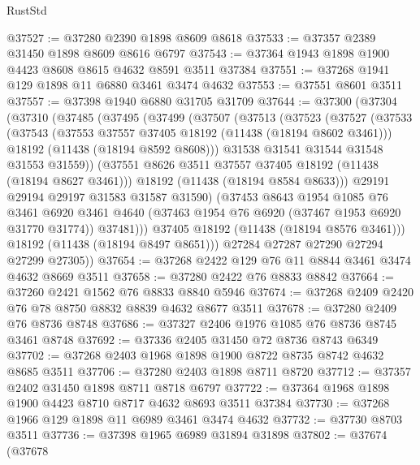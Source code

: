 \begin{lexlean}{RustStd}
\begin{coremodule}
@37527 := @37280 @2390 @1898 @8609 @8618
@37533 := @37357 @2389 @31450 @1898 @8609 @8616 @6797
@37543 := @37364 @1943 @1898 @1900 @4423 @8608 @8615 @4632 @8591 @3511 @37384
@37551 := @37268 @1941 @129 @1898 @11 @6880 @3461 @3474 @4632
@37553 := @37551 @8601 @3511
@37557 := @37398 @1940 @6880 @31705 @31709
@37644 := @37300
    (@37304
      (@37310
        (@37485
          (@37495
            (@37499
              (@37507
                (@37513
                  (@37523
                    (@37527
                      (@37533
                        (@37543
                          (@37553 @37557 @37405 @18192 (@11438 (@18194 @8602 @3461)))
                          @18192
                          (@11438 (@18194 @8592 @8608)))
                        @31538
                        @31541
                        @31544
                        @31548
                        @31553
                        @31559))
                    (@37551 @8626 @3511 @37557 @37405 @18192 (@11438 (@18194 @8627 @3461)))
                    @18192
                    (@11438 (@18194 @8584 @8633)))
                  @29191
                  @29194
                  @29197
                  @31583
                  @31587
                  @31590)
                (@37453
                  @8643
                  @1954
                  @1085
                  @76
                  @3461
                  @6920
                  @3461
                  @4640
                  (@37463 @1954 @76 @6920 (@37467 @1953 @6920 @31770 @31774))
                  @37481)))
            @37405
            @18192
            (@11438 (@18194 @8576 @3461)))
          @18192
          (@11438 (@18194 @8497 @8651)))
        @27284
        @27287
        @27290
        @27294
        @27299
        @27305))
@37654 := @37268 @2422 @129 @76 @11 @8844 @3461 @3474 @4632 @8669 @3511
@37658 := @37280 @2422 @76 @8833 @8842
@37664 := @37260 @2421 @1562 @76 @8833 @8840 @5946
@37674 := @37268 @2409 @2420 @76 @78 @8750 @8832 @8839 @4632 @8677 @3511
@37678 := @37280 @2409 @76 @8736 @8748
@37686 := @37327 @2406 @1976 @1085 @76 @8736 @8745 @3461 @8748
@37692 := @37336 @2405 @31450 @72 @8736 @8743 @6349
@37702 := @37268 @2403 @1968 @1898 @1900 @8722 @8735 @8742 @4632 @8685 @3511
@37706 := @37280 @2403 @1898 @8711 @8720
@37712 := @37357 @2402 @31450 @1898 @8711 @8718 @6797
@37722 := @37364 @1968 @1898 @1900 @4423 @8710 @8717 @4632 @8693 @3511 @37384
@37730 := @37268 @1966 @129 @1898 @11 @6989 @3461 @3474 @4632
@37732 := @37730 @8703 @3511
@37736 := @37398 @1965 @6989 @31894 @31898
@37802 := @37674
    (@37678

\end{coremodule}
\end{lexlean}
